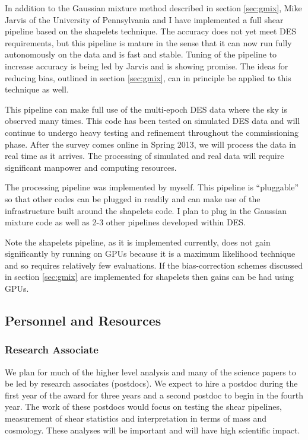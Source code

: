 \documentclass[12pt]{article}
\newcommand{\surveyproper}{Spring 2013}
\begin{document}
In addition to the Gaussian mixture method described in section \ref{sec:gmix},
Mike Jarvis of the University of Pennsylvania and I have implemented a full
shear pipeline based on the shapelets technique\cite{Bern02}.   The accuracy
does not yet meet DES requirements, but this pipeline is mature in the sense
that it can now run fully autonomously on the data and is fast and stable.
Tuning of the pipeline to increase accuracy is being led by Jarvis and is
showing promise.   The ideas for reducing bias, outlined in section
\ref{sec:gmix}, can in principle be applied to this technique as well.

This pipeline can make full use of the multi-epoch DES data where the sky is
observed many times.  This code has been tested on simulated DES data and will
continue to undergo heavy testing and refinement throughout the commissioning
phase.  After the survey comes online in \surveyproper, we will process the
data in real time as it arrives.  The processing of simulated and real data
will require significant manpower and computing resources.

The processing pipeline was implemented by myself.  This pipeline is
``pluggable'' so that other codes can be plugged in readily and can make use of
the infrastructure built around the shapelets code.  I plan to plug in
the Gaussian mixture code as well as 2-3 other pipelines developed within
DES.

Note the shapelets pipeline, as it is implemented currently, does not gain
significantly by running on GPUs because it is a maximum likelihood technique
and so requires relatively few evaluations.  If the bias-correction schemes
discussed in section \ref{sec:gmix} are implemented for shapelets then
gains can be had using GPUs.

\subsection{Personnel and Resources}

\subsubsection{Research Associate}

We plan for much of the higher level analysis and many of the science papers to
be led by research associates (postdocs).  We expect to hire a postdoc during
the first year of the award for three years and a second postdoc to begin in
the fourth year.  The work of these postdocs would focus on testing the shear
pipelines, measurement of shear statistics and interpretation in terms of mass
and cosmology.  These analyses will be important and will have high scientific
impact.
\end{document}
